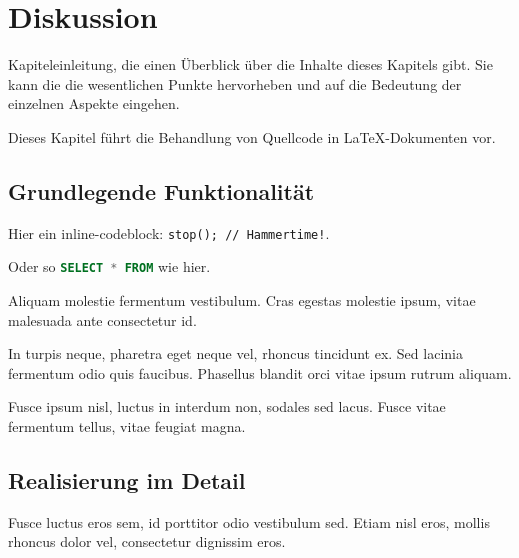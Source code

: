 \chapter{Diskussion}

Kapiteleinleitung, die einen Überblick über die Inhalte dieses Kapitels gibt. Sie kann die die wesentlichen Punkte hervorheben und auf die Bedeutung der einzelnen Aspekte eingehen.

Dieses Kapitel führt die Behandlung von Quellcode in \LaTeX-Dokumenten vor. 

\lipsum[1][1-4]

\section{Grundlegende Funktionalität}

Hier ein inline-codeblock: \lstinline[language=pseudo]{stop(); // Hammertime!}.\cite{tuoski:2022}

Oder so \lstinline[language=sql]{SELECT * FROM} wie hier.



Aliquam molestie fermentum vestibulum. Cras egestas molestie ipsum, vitae malesuada ante consectetur id. 


In turpis neque, pharetra eget neque vel, rhoncus tincidunt ex. Sed lacinia fermentum odio quis faucibus. Phasellus blandit orci vitae ipsum rutrum aliquam. 


Fusce ipsum nisl, luctus in interdum non, sodales sed lacus. Fusce vitae fermentum tellus, vitae feugiat magna. 

\bigskip
\lipsum[1]
\newpage

\section{Realisierung im Detail}

Fusce luctus eros sem, id porttitor odio vestibulum sed. Etiam nisl eros, mollis rhoncus dolor vel, consectetur dignissim eros.

